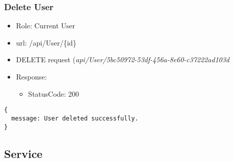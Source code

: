 \documentclass[11pt]{article}
\begin{document}
\subsubsection{Delete User}
\label{sec:org59017c7}
\begin{itemize}
\item Role: Current User
\item url: /api/User/\{id\}
\item DELETE request (\emph{api/User/5bc50972-53df-456a-8e60-c37222ad103d}
\item Response:
\begin{itemize}
\item StatusCode: 200
\end{itemize}
\end{itemize}
\begin{verbatim}
{
  message: User deleted successfully.
}
\end{verbatim}
\subsection{Service}
\label{sec:orga58e9dd}
\end{document}
